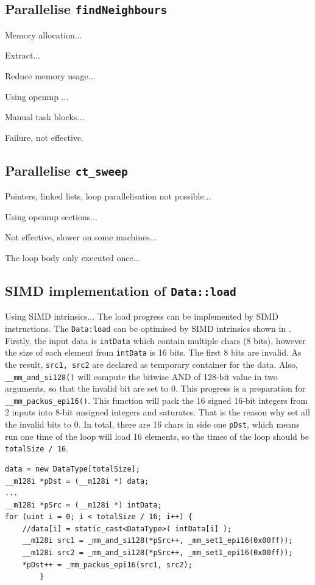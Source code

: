 \documentclass[conference]{IEEEtran}
\begin{document}
\subsection{Parallelise \texttt{findNeighbours}}

Memory allocation...

Extract...

Reduce memory usage...

Using openmp \cite{dagum1998openmp}...

Manual task blocks...

Failure, not effective.

\subsection{Parallelise \texttt{ct\_sweep}}

Pointers, linked lists, loop parallelisation not possible...

Using openmp sections...

Not effective, slower on some machines...

The loop body only executed once...

\subsection{SIMD implementation of \texttt{Data::load}}

Using SIMD intrinsics...
The load progress can be implemented by SIMD instructions. The \texttt{Data:load} can be optimised by SIMD intrinsics shown in \cite{advnotes}. Firstly, the input data is \texttt{intData} which contain multiple chars (8 bits), however the size of each element from \texttt{intData} is 16 bits. The first 8 bits are invalid. As the result, \texttt{src1, src2} are declared as temporary container for the data. Also, \texttt{\_\_mm\_and\_si128()} will compute the bitwise AND of 128-bit value in two arguments, so that the invalid bit are set to 0. This progress is a preparation for \texttt{\_\_mm\_packus\_epi16()}. This function will pack the 16 signed 16-bit integers from 2 inputs into 8-bit unsigned integers and saturates. That is the reason why set all the invalid bits to 0. In total, there are 16 chars in side one \texttt{pDst}, which means run one time of the loop will load 16 elements, so the times of the loop should be \texttt{totalSize / 16}.
\begin{lstlisting}[caption={Data Load with SIMD Intrinsics},captionpos=b,label=lst:mem]
data = new DataType[totalSize];
__m128i *pDst = (__m128i *) data;
...
__m128i *pSrc = (__m128i *) intData;
for (uint i = 0; i < totalSize / 16; i++) {
	//data[i] = static_cast<DataType>( intData[i] );
	__m128i src1 = _mm_and_si128(*pSrc++, _mm_set1_epi16(0x00ff));
	__m128i src2 = _mm_and_si128(*pSrc++, _mm_set1_epi16(0x00ff));
	*pDst++ = _mm_packus_epi16(src1, src2);
		}
\end{lstlisting}
\end{document}
